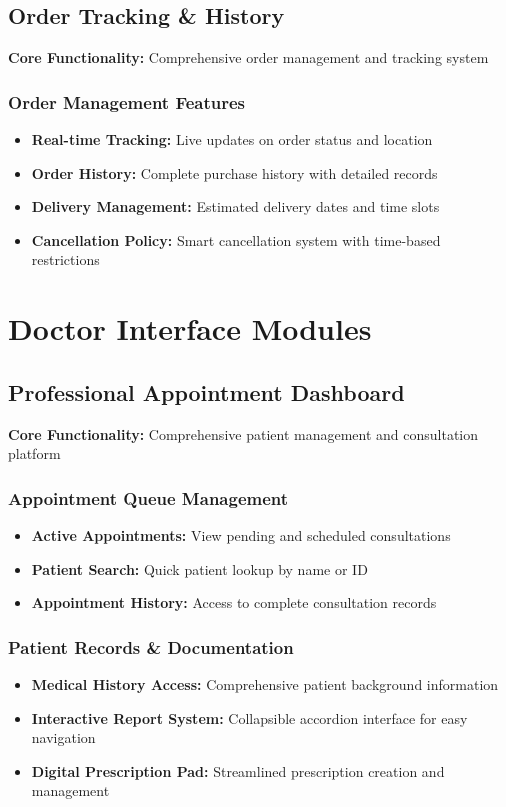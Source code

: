 \documentclass[12pt]{article}
\begin{document}
\subsection{Order Tracking \& History}
\textbf{Core Functionality:} Comprehensive order management and tracking system

\subsubsection{Order Management Features}
\begin{itemize}[leftmargin=1cm]
    \item \textbf{Real-time Tracking:} Live updates on order status and location
    \item \textbf{Order History:} Complete purchase history with detailed records
    \item \textbf{Delivery Management:} Estimated delivery dates and time slots
    \item \textbf{Cancellation Policy:} Smart cancellation system with time-based restrictions
\end{itemize}

\section{Doctor Interface Modules}

\subsection{Professional Appointment Dashboard}
\textbf{Core Functionality:} Comprehensive patient management and consultation platform

\subsubsection{Appointment Queue Management}
\begin{itemize}[leftmargin=1cm]
    \item \textbf{Active Appointments:} View pending and scheduled consultations
    \item \textbf{Patient Search:} Quick patient lookup by name or ID
    \item \textbf{Appointment History:} Access to complete consultation records
\end{itemize}

\subsubsection{Patient Records \& Documentation}
\begin{itemize}[leftmargin=1cm]
    \item \textbf{Medical History Access:} Comprehensive patient background information
    \item \textbf{Interactive Report System:} Collapsible accordion interface for easy navigation
    \item \textbf{Digital Prescription Pad:} Streamlined prescription creation and management
\end{itemize}
\end{document}
